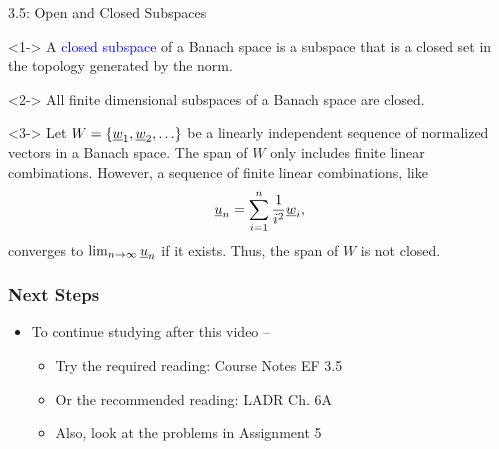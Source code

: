 \documentclass[10pt,english,aspectratio=169,handout]{beamer}
\begin{document}
\begin{frame}{3.5: Open and Closed Subspaces}

\begin{definition}<1->
A \textcolor{blue}{closed subspace} of a Banach space is a subspace that is a closed set in the topology generated by the norm.
\end{definition}
\vspace{-0.5mm}

\begin{theorem}<2->
All finite dimensional subspaces of a Banach space are closed.
\end{theorem}
\vspace{-0.5mm}

\begin{example}<3->
Let $W = \{\underline{w}_1 ,\underline{w}_2 , \ldots \}$ be a linearly independent sequence of normalized vectors in a Banach space.
The span of $W$ only includes finite linear combinations.
However, a sequence of finite linear combinations, like \vspace{-2mm}
\[ \vecnot{u}_n = \sum_{i=1}^n \frac{1}{i^2} \vecnot{w}_i , \vspace{-1.5mm}\]  converges to $\lim_{n\to \infty} \underline{u}_n$ if it exists.
Thus, the span of $W$ is not closed.
\end{example}
\vspace{-0.5mm}


\end{frame}

\begin{frame} \frametitle{Next Steps}

\begin{itemize}
\setlength\itemsep{5mm}
\item To continue studying after this video -- \vspace{2mm}

\begin{itemize}
 \setlength\itemsep{3mm}
 \item Try the required reading: Course Notes EF 3.5
 \item Or the recommended reading: LADR Ch. 6A
 \item Also, look at the problems in Assignment 5
\end{itemize}
\end{itemize}


\end{frame}
\end{document}
